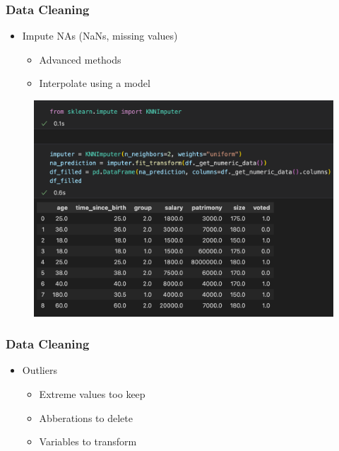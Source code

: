 \begin{frame}\frametitle{Data Cleaning}
   \begin{itemize}
      \item Impute NAs (NaNs, missing values)
      \begin{itemize}
         \item Advanced methods
         \item Interpolate using a model
      \end{itemize}
   \end{itemize}
   \vspace{.5cm}
   \begin{minipage}{0.68\linewidth}
      \begin{figure}[H]
         \includegraphics[scale=.35]{../images/illustrations/data_cleaning_na_imputation_model_2.png}
      \end{figure}
   \end{minipage}
\end{frame}



\begin{frame}\frametitle{Data Cleaning}
   \begin{itemize}
      \item Outliers
      \begin{itemize}
         \item Extreme values too keep
         \item Abberations to delete
         \item Variables to transform
      \end{itemize}
   \end{itemize}
\end{frame}


